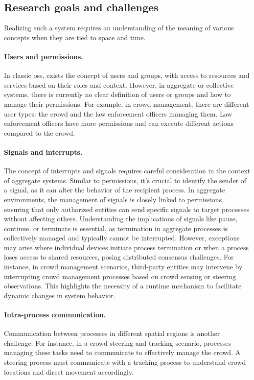 \documentclass[12pt, a4paper]{article}
\begin{document}
\subsection{Research goals and challenges}
\label{subsec:research-goals-and-challenges}

Realizing such a system requires an understanding of the meaning of various concepts when they are tied to space and time.

\paragraph{Users and permissions.}
\label{par:users-and-permissions}
In classic \acp{os},
exists the concept of users and groups,
with access to resources and services based on their roles and context.
%
However,
in aggregate or collective systems,
there is currently no clear definition of users or groups and how to manage their permissions.
%
For example,
in crowd management,
there are different user types:
the crowd and the law enforcement officers managing them.
%
Law enforcement officers have more permissions and can execute different actions compared to the crowd.

\paragraph{Signals and interrupts.}
\label{par:signals-and-interrupts}
The concept of interrupts and signals requires careful consideration in the context of aggregate systems.
%
Similar to permissions,
it's crucial to identify the sender of a signal,
as it can alter the behavior of the recipient process.
%
In aggregate environments,
the management of signals is closely linked to permissions,
ensuring that only authorized entities can send specific signals to target processes without affecting others.
%
Understanding the implications of signals like pause, continue, or terminate is essential,
as termination in aggregate processes is collectively managed and typically cannot be interrupted.
%
However,
exceptions may arise where individual devices initiate process termination or when a process loses access to shared resources,
posing distributed consensus challenges.
%
For instance, in crowd management scenarios,
third-party entities may intervene by interrupting crowd management processes based on crowd sensing or steering observations.
%
This highlights the necessity of a runtime mechanism to facilitate dynamic changes in system behavior.

\paragraph{Intra-process communication.}
\label{par:intra-process-communication}
Communication between processes in different spatial regions is another challenge.
%
For instance,
in a crowd steering and tracking scenario,
processes managing these tasks need to communicate to effectively manage the crowd.
%
A steering process must communicate with a tracking process to understand crowd locations and direct movement accordingly.
\end{document}
